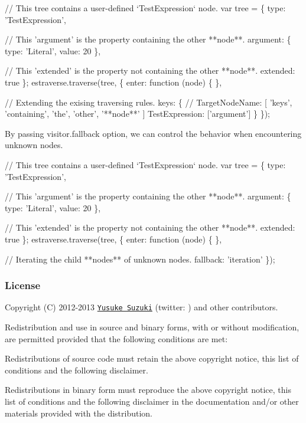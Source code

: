 \begin{DoxyCode}
// This tree contains a user-defined `TestExpression` node.
var tree = \{
    type: 'TestExpression',

    // This 'argument' is the property containing the other **node**.
    argument: \{
        type: 'Literal',
        value: 20
    \},

    // This 'extended' is the property not containing the other **node**.
    extended: true
\};
estraverse.traverse(tree, \{
    enter: function (node) \{ \},

    // Extending the exising traversing rules.
    keys: \{
        // TargetNodeName: [ 'keys', 'containing', 'the', 'other', '**node**' ]
        TestExpression: ['argument']
    \}
\});
\end{DoxyCode}


By passing {\ttfamily visitor.\+fallback} option, we can control the behavior when encountering unknown nodes. 
\begin{DoxyCode}
// This tree contains a user-defined `TestExpression` node.
var tree = \{
    type: 'TestExpression',

    // This 'argument' is the property containing the other **node**.
    argument: \{
        type: 'Literal',
        value: 20
    \},

    // This 'extended' is the property not containing the other **node**.
    extended: true
\};
estraverse.traverse(tree, \{
    enter: function (node) \{ \},

    // Iterating the child **nodes** of unknown nodes.
    fallback: 'iteration'
\});
\end{DoxyCode}


\subsubsection*{License}

Copyright (C) 2012-\/2013 \href{http://github.com/Constellation}{\tt Yusuke Suzuki} (twitter\+: \href{http://twitter.com/Constellation}{\tt }) and other contributors.

Redistribution and use in source and binary forms, with or without modification, are permitted provided that the following conditions are met\+:


\begin{DoxyItemize}
\item Redistributions of source code must retain the above copyright notice, this list of conditions and the following disclaimer.
\item Redistributions in binary form must reproduce the above copyright notice, this list of conditions and the following disclaimer in the documentation and/or other materials provided with the distribution.
\end{DoxyItemize}

